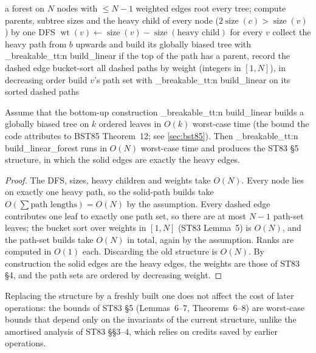 \documentclass[11pt,a4paper,oneside]{report}
\theoremstyle{plain}
\theoremstyle{definition}
\theoremstyle{remark}
\DeclareRobustCommand{\code}[1]{\mtp_breakable_tt:n {#1}}
\newcommand{\size}{\operatorname{size}}
\newcommand{\wt}{\operatorname{wt}}
\begin{document}
\begin{algorithm}[ht]
\caption{\code{build_linear_forest}: static construction of the ST83 structure}\label{alg:build-forest}
\begin{algorithmic}[1]
\Require a forest on \(N\) nodes with \(\le N-1\) weighted edges
\State root every tree; compute parents, subtree sizes and the heavy child of every node
  (\(2\size(c)>\size(v)\)) by one DFS 
\State \(\wt(v)\gets\size(v)-\size(\text{heavy child})\) for every \(v\) 
 
  \State collect the heavy path from \(b\) upwards and build its globally biased tree with
    \code{build_linear} 
  \State if the top of the path has a parent, record the dashed edge
\EndFor
\State bucket-sort all dashed paths by weight (integers in \([1,N]\)), in decreasing order 
  \State build \(v\)'s path set with \code{build_linear} on its sorted dashed paths
\EndFor
\end{algorithmic}
\end{algorithm}

\begin{lemma}\label{lem:build-forest}
Assume that the bottom-up construction \code{build_linear} builds a globally biased tree on
\(k\) ordered leaves in \(O(k)\) worst-case time (the bound the code attributes to BST85
Theorem~12; see \cref{sec:bst85}). Then \code{build_linear_forest} runs in \(O(N)\) worst-case
time and produces the ST83 \S5 structure, in which the solid edges are exactly the heavy edges.
\end{lemma}
\begin{proof}
The DFS, sizes, heavy children and weights take \(O(N)\). Every node lies on exactly one heavy
path, so the solid-path builds take \(O(\sum\text{path lengths})=O(N)\) by the assumption.
Every dashed edge contributes one leaf to exactly one path set, so there are at most \(N-1\)
path-set leaves; the bucket sort over weights in \([1,N]\) (ST83 Lemma~5) is \(O(N)\), and the
path-set builds take \(O(N)\) in total, again by the assumption. Ranks are computed in \(O(1)\)
each. Discarding the old structure is \(O(N)\). By construction the solid edges are the heavy
edges, the weights are those of ST83 \S4, and the path sets are ordered by decreasing weight.
\end{proof}

Replacing the structure by a freshly built one does not affect the cost of later operations:
the bounds of ST83 \S5 (Lemmas~6--7, Theorems~6--8) are worst-case bounds that depend only on
the invariants of the current structure, unlike the amortised analysis of ST83 \S\S3--4, which
relies on credits saved by earlier operations.
\end{document}
